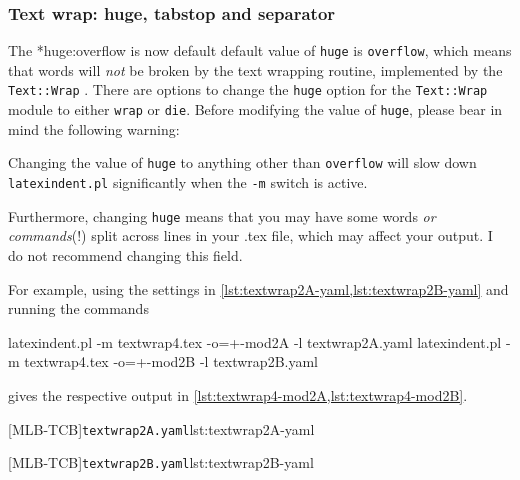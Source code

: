 \subsubsection{Text wrap: huge, tabstop and separator}
 The *{huge:overflow is now default} default value of \texttt{huge}
 is \texttt{overflow}, which means that words will \emph{not} be broken by the text
 wrapping routine, implemented by the \texttt{Text::Wrap} \cite{textwrap}. There are
 options to change the \texttt{huge} option for the \texttt{Text::Wrap} module to either
 \texttt{wrap} or \texttt{die}. Before modifying the value of \texttt{huge}, please bear
 in mind the following warning: %
 \begin{warning}
  \raggedright
  Changing the value of \texttt{huge} to anything other than \texttt{overflow} will slow
  down \texttt{latexindent.pl} significantly when the \texttt{-m} switch is active.

  Furthermore, changing \texttt{huge} means that you may have some words \emph{or
  commands}(!) split across lines in your .tex file, which may affect your output. I do
  not recommend changing this field.
 \end{warning}

 \begin{example}
 For example, using the settings in \cref{lst:textwrap2A-yaml,lst:textwrap2B-yaml} and
 running the commands  

 \begin{commandshell}
	 latexindent.pl -m textwrap4.tex -o=+-mod2A -l textwrap2A.yaml
	 latexindent.pl -m textwrap4.tex -o=+-mod2B -l textwrap2B.yaml
\end{commandshell}

 gives the respective output in \cref{lst:textwrap4-mod2A,lst:textwrap4-mod2B}.

 \begin{cmhtcbraster}[raster column skip=.1\linewidth]
  [MLB-TCB]{\texttt{textwrap2A.yaml}}{lst:textwrap2A-yaml}

  [MLB-TCB]{\texttt{textwrap2B.yaml}}{lst:textwrap2B-yaml}
 \end{cmhtcbraster}
 \end{example}

